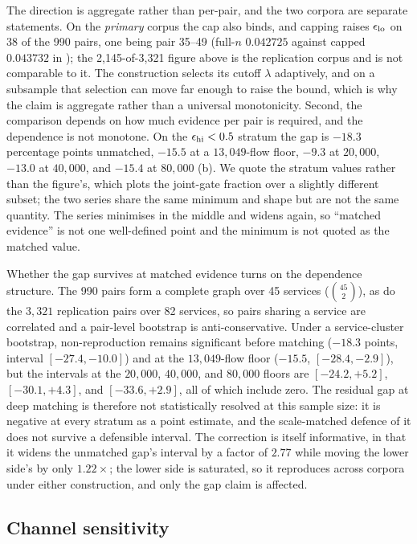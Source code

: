 The direction is aggregate rather than per-pair, and the two corpora are
separate statements. On the \emph{primary} corpus the cap also binds, and capping
raises $\epsilon_{\mathrm{lo}}$ on 38 of the 990 pairs, one being pair 35--49 (full-$n$ $0.042725$
against capped $0.043732$ in ); the 2{,}145-of-3{,}321 figure
above is the replication corpus and is not comparable to it. The construction
selects its cutoff $\lambda$ adaptively, and on a subsample that selection can
move far enough to raise the bound, which is why the claim is aggregate rather
than a universal monotonicity.
Second, the comparison depends on how much evidence per pair is required, and
the dependence is not monotone. On the $\epsilon_{\mathrm{hi}} < 0.5$ stratum the gap is $-18.3$
percentage points unmatched, $-15.5$ at a $13{,}049$-flow floor, $-9.3$ at
$20{,}000$, $-13.0$ at $40{,}000$, and $-15.4$ at $80{,}000$
(b). We quote the stratum values rather than the figure's,
which plots the joint-gate fraction over a slightly different subset; the two
series share the same minimum and shape but are not the same quantity. The series
minimises in the middle and widens again, so ``matched evidence'' is not one
well-defined point and the minimum is not quoted as the matched value.

Whether the gap survives at matched evidence turns on the dependence structure.
The 990 pairs form a complete graph over 45 services ($\binom{45}{2}$), as do the
$3{,}321$ replication pairs over 82 services, so pairs sharing a service are
correlated and a pair-level bootstrap is anti-conservative. Under a
service-cluster bootstrap, non-reproduction remains significant before matching
($-18.3$ points, interval $[-27.4,-10.0]$) and at the $13{,}049$-flow floor
($-15.5$, $[-28.4,-2.9]$), but the intervals at the $20{,}000$, $40{,}000$, and
$80{,}000$ floors are $[-24.2,+5.2]$, $[-30.1,+4.3]$, and $[-33.6,+2.9]$, all of
which include zero. The residual gap at deep matching is therefore not
statistically resolved at this sample size: it is negative at every stratum as a
point estimate, and the scale-matched defence of it does not survive a
defensible interval. The correction is itself informative, in that it widens the
unmatched gap's interval by a factor of $2.77$ while moving the lower side's by
only $1.22\times$; the lower side is saturated, so it reproduces across corpora
under either construction, and only the gap claim is affected.

\subsection{Channel sensitivity}
\label{sec:discussion/sensitivity}

